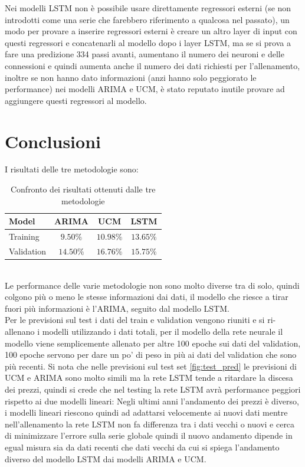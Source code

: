 \documentclass[12pt, onecolumn]{article}
\begin{document}
Nei modelli LSTM non è possibile usare direttamente regressori esterni (se non introdotti come una serie che farebbero riferimento a qualcosa nel passato), un modo per provare a inserire regressori esterni è creare un altro layer di input con questi regressori e concatenarli al modello dopo i layer LSTM, ma se si prova a fare una predizione 334 passi avanti, aumentano il numero dei neuroni e delle connessioni e quindi aumenta anche il numero dei dati richiesti per l'allenamento, inoltre se non hanno dato informazioni (anzi hanno solo peggiorato le performance) nei modelli ARIMA e UCM, è stato reputato inutile provare ad aggiungere questi regressori al modello.
\section*{Conclusioni}
I risultati delle tre metodologie sono:
\begin{table}[!h]
  \centering
  \begin{tabular}{|l|c|c|c|}
    \hline
    Model & ARIMA & UCM & LSTM\\
    \hline
    Training & $9.50\%$ & $10.98\%$ & $13.65\%$\\
    Validation & $14.50\%$ & $16.76\%$ & $15.75\%$\\
    \hline
  \end{tabular}
  \caption{Confronto dei risultati ottenuti dalle tre metodologie }
  \label{tab:confronto}
\end{table}\\
Le performance delle varie metodologie non sono molto diverse tra di solo, quindi colgono più o meno le stesse informazioni dai dati, il modello che riesce a tirar fuori più informazioni è l'ARIMA, seguito dal modello LSTM.\\
Per le previsioni sul test i dati del train e validation vengono riuniti e si ri-allenano i modelli utilizzando i dati totali, per il modello della rete neurale il modello viene semplicemente allenato per altre 100 epoche sui dati del validation, 100 epoche servono per dare un po' di peso in più ai dati del validation che sono più recenti.
Si nota che nelle previsioni sul test set \ref{fig:test_pred} le previsioni di UCM e ARIMA sono molto simili ma la rete LSTM tende a ritardare la discesa dei prezzi, quindi si crede che nel testing la rete LSTM avrà performance peggiori rispetto ai due modelli lineari: Negli ultimi anni l'andamento dei prezzi è diverso, i modelli lineari riescono quindi ad adattarsi velocemente ai nuovi dati mentre nell'allenamento la rete LSTM non fa differenza tra i dati vecchi o nuovi e cerca di minimizzare l'errore sulla serie globale quindi il nuovo andamento dipende in egual misura sia da dati recenti che dati vecchi da cui si spiega l'andamento diverso del modello LSTM dai modelli ARIMA e UCM.
\end{document}
